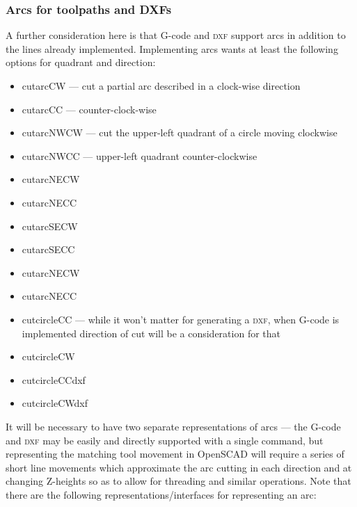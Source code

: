 \documentclass{ltxdoc}
\begin{document}
\subsubsection{Arcs for toolpaths and DXFs}
 
A further consideration here is that G-code and \textsc{dxf} support arcs in addition to the lines already implemented. Implementing arcs wants at least the following options for quadrant and direction:
 
\begin{itemize}
\item cutarcCW --- cut a partial arc described in a clock-wise direction
\item cutarcCC --- counter-clock-wise
\item cutarcNWCW --- cut the upper-left quadrant of a circle moving clockwise
\item cutarcNWCC --- upper-left quadrant counter-clockwise
\item cutarcNECW
\item cutarcNECC
\item cutarcSECW
\item cutarcSECC
\item cutarcNECW
\item cutarcNECC
\item cutcircleCC --- while it won't matter for generating a \textsc{dxf}, when G-code is implemented
                      direction of cut will be a consideration for that
\item cutcircleCW
\item cutcircleCCdxf
\item cutcircleCWdxf
\end{itemize}
 
It will be necessary to have two separate representations of arcs --- the G-code and \textsc{dxf} may be easily and directly supported with a single command, but representing the matching tool movement in OpenSCAD will require a series of short line movements which approximate the arc cutting in each direction and at changing Z-heights so as to allow for threading and similar operations. 
Note that there are the following representations/interfaces for representing an arc:

 
\end{document}
